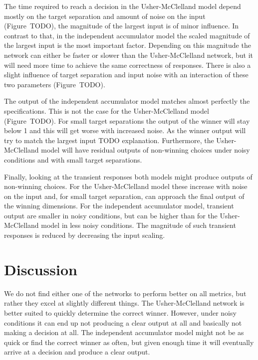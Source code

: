 \documentclass[10pt,letterpaper]{article}
\begin{document}
The time required to reach a decision in the Usher-McClelland model depend 
mostly on the target separation and amount of noise on the input (Figure~TODO), 
the magnitude of the largest input is of minor influence. In contrast to that, 
in the independent accumulator model the scaled magnitude of the largest input 
is the most important factor. Depending on this magnitude the network can either 
be faster or slower than the Usher-McClelland network, but it will need more 
time to achieve the same correctness of responses. There is also a slight 
influence of target separation and input noise with an interaction of these two 
parameters (Figure~TODO).

The output of the independent accumulator model matches almost perfectly the 
specifications. This is not the case for the Usher-McClelland model 
(Figure~TODO).  For small target separations the output of the winner will stay 
below 1 and this will get worse with increased noise. As the winner output will 
try to match the largest input TODO explanation. Furthermore, the 
Usher-McClelland model will have residual outputs of non-winning choices under 
noisy conditions and with small target separations.

Finally, looking at the transient responses both models might produce outputs of 
non-winning choices. For the Usher-McClelland model these increase with noise on 
the input and, for small target separation, can approach the final output of the 
winning dimensions. For the independent accumulator model, transient output are 
smaller in noisy conditions, but can be higher than for the Usher-McClelland 
model in less noisy conditions. The magnitude of such transient responses is 
reduced by decreasing the input scaling.

\section{Discussion}
We do not find either one of the networks to perform better on all metrics, but 
rather they excel at slightly different things. The Usher-McClelland network is 
better suited to quickly determine the correct winner. However, under noisy 
conditions it can end up not producing a clear output at all and basically not 
making a decision at all. The independent accumulator model might not be as 
quick or find the correct winner as often, but given enough time it will 
eventually arrive at a decision and produce a clear output.
\end{document}
